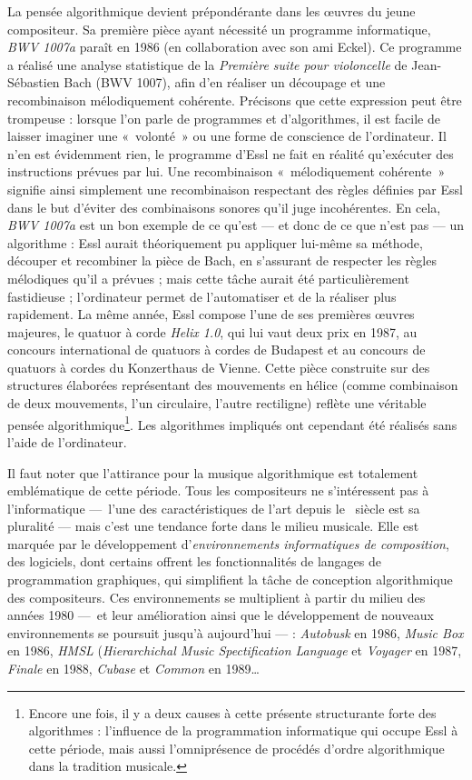 \documentclass[a4paper,12pt]{article}
\newcommand{\guill}[1]{«~#1~»}
\begin{document}
La pensée algorithmique devient prépondérante dans les œuvres du jeune compositeur. Sa première pièce ayant nécessité un programme informatique, \emph{BWV 1007a} paraît en 1986 (en collaboration avec son ami Eckel). Ce programme a réalisé une analyse statistique de la \emph{Première suite pour violoncelle} de Jean-Sébastien Bach (BWV 1007), afin d'en réaliser un découpage et une recombinaison mélodiquement cohérente. Précisons que cette expression peut être trompeuse : lorsque l'on parle de programmes et d'algorithmes, il est facile de laisser imaginer une \guill{volonté} ou une forme de conscience de l'ordinateur. Il n'en est évidemment rien, le programme d'Essl ne fait en réalité qu'exécuter des instructions prévues par lui. Une recombinaison \guill{mélodiquement cohérente} signifie ainsi simplement une recombinaison respectant des règles définies par Essl dans le but d'éviter des combinaisons sonores qu'il juge incohérentes. En cela, \emph{BWV 1007a} est un bon exemple de ce qu'est --- et donc de ce que n'est pas --- un algorithme : Essl aurait théoriquement pu appliquer lui-même sa méthode, découper et recombiner la pièce de Bach, en s'assurant de respecter les règles mélodiques qu'il a prévues ; mais cette tâche aurait été particulièrement fastidieuse ; l'ordinateur permet de l'automatiser et de la réaliser plus rapidement. La même année, Essl compose l'une de ses premières œuvres majeures, le quatuor à corde \emph{Helix 1.0}, qui lui vaut deux prix en 1987, au concours international de quatuors à cordes de Budapest et au concours    de quatuors à cordes du Konzerthaus de Vienne. Cette pièce construite sur des structures élaborées représentant des mouvements en hélice (comme combinaison de deux mouvements, l'un circulaire, l'autre rectiligne) reflète une véritable pensée algorithmique\footnote{Encore une fois, il y a deux causes à cette présente structurante forte des algorithmes : l'influence de la programmation informatique qui occupe Essl à cette période, mais aussi l'omniprésence de procédés d'ordre algorithmique dans la tradition musicale.}. Les algorithmes impliqués ont cependant été réalisés sans l'aide de l'ordinateur.

Il faut noter que l'attirance pour la musique algorithmique est totalement emblématique de cette période. Tous les compositeurs ne s'intéressent pas à l'informatique ---~l'une des caractéristiques de l'art depuis le \XXe~siècle est sa pluralité --- mais c'est une tendance forte dans le milieu musicale. Elle est marquée par le développement d'\emph{environnements informatiques de composition}, des logiciels, dont certains offrent les fonctionnalités de langages de programmation graphiques, qui simplifient la tâche de conception algorithmique des compositeurs. Ces environnements se multiplient à partir du milieu des années 1980 ---~et leur amélioration ainsi que le développement de nouveaux environnements se poursuit jusqu'à aujourd'hui --- : \emph{Autobusk} en 1986, \emph{Music Box} en 1986, \emph{HMSL} (\emph{Hierarchichal Music Spectification Language} et \emph{Voyager} en 1987, \emph{Finale} en 1988, \emph{Cubase} et \emph{Common} en 1989\dots
\end{document}
